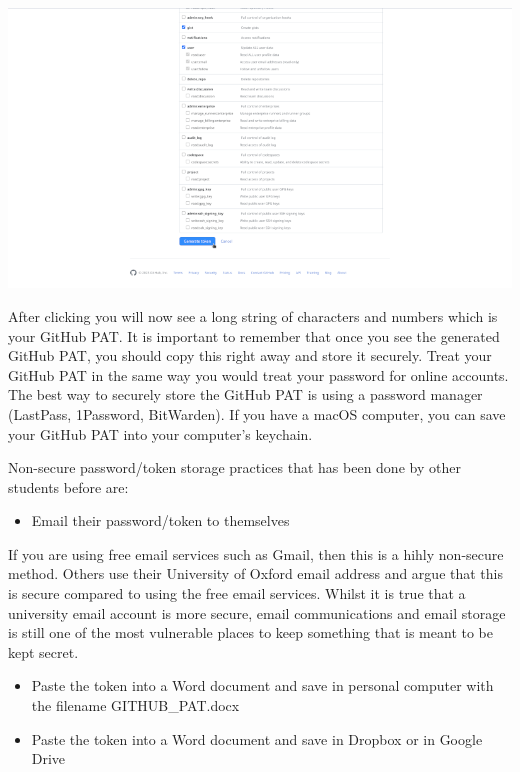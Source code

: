 \documentclass[
  12pt,
]{book}
\providecommand{\tightlist}{%
  \setlength{\itemsep}{0pt}\setlength{\parskip}{0pt}}
\begin{document}
\includegraphics{images/github_pat11.png}

After clicking you will now see a long string of characters and numbers which is your GitHub PAT. It is important to remember that once you see the generated GitHub PAT, you should copy this right away and store it securely. Treat your GitHub PAT in the same way you would treat your password for online accounts. The best way to securely store the GitHub PAT is using a password manager (LastPass, 1Password, BitWarden). If you have a macOS computer, you can save your GitHub PAT into your computer's keychain.

Non-secure password/token storage practices that has been done by other students before are:

\begin{itemize}
\tightlist
\item
  Email their password/token to themselves
\end{itemize}

If you are using free email services such as Gmail, then this is a hihly non-secure method. Others use their University of Oxford email address and argue that this is secure compared to using the free email services. Whilst it is true that a university email account is more secure, email communications and email storage is still one of the most vulnerable places to keep something that is meant to be kept secret.

\begin{itemize}
\item
  Paste the token into a Word document and save in personal computer with the filename GITHUB\_PAT.docx
\item
  Paste the token into a Word document and save in Dropbox or in Google Drive
\end{itemize}
\end{document}
